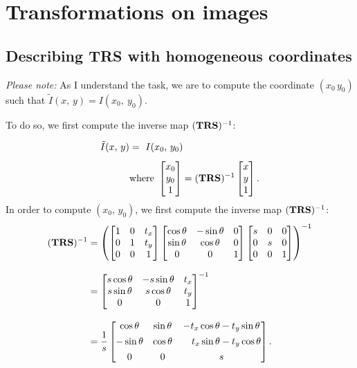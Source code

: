 \newpage
\newcommand{\mat}[1]{\begin{bmatrix}#1\end{bmatrix}}
\section{Transformations on images}

\subsection{Describing \textbf{TRS} with homogeneous coordinates}

\emph{Please note:} As I understand the task, we are to compute the coordinate
$(x_0\, y_0)$ such that $\tilde{I}(x,\, y) = I(x_0,\ y_0)$.

To do so, we first compute
the inverse map $(\mathbf{TRS})^{-1}$:


\begin{align*}
  \tilde{I}(x,\, y) &= \ I(x_0,\, y_0)\\[4pt]
  &\text{where } \mat{x_0\\y_0\\1} =
    (\mbf{TRS})^{-1}
    \mat{x\\y\\1}.
\end{align*}
In order to compute $(x_0,\, y_0)$, we first compute the inverse map
$(\mathbf{TRS})^{-1}$:
\begin{align*}
  (\mbf{TRS})^{-1} &= 
  \left(
  \mat{1&0&t_x\\0&1&t_y\\0&0&1}
  \mat{\cos \theta&-\sin \theta&0\\\sin \theta&\cos \theta & 0\\0&0&1}
  \mat{s&0&0\\0&s&0\\0&0&1}
  \right)^{-1}\\[8pt]
  &=
  \mat{s \cos \theta & -s \sin \theta & t_x\\
       s \sin \theta & s \cos \theta & t_y\\
       0 & 0 & 1}^{-1}\\[8pt]
  &=
  \frac 1 s 
  \mat{\cos \theta   & \sin \theta & -t_x \cos \theta -t_y \sin \theta \\[4pt]
  - \sin \theta & \cos \theta & \quad t_x \sin \theta - t_y \cos \theta\\[4pt]
  0 & 0 & s
  }.
\end{align*}

